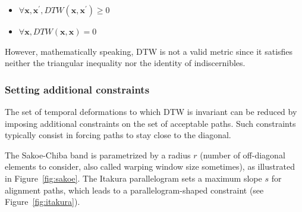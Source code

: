\begin{itemize}
\item $\forall \mathbf{x}, \mathbf{x}^\prime, DTW(\mathbf{x}, \mathbf{x}^\prime) \geq 0$
\item $\forall \mathbf{x}, DTW(\mathbf{x}, \mathbf{x}) = 0$
\end{itemize}

However, mathematically speaking, DTW is not a valid metric since it
satisfies neither the triangular inequality nor the identity of indiscernibles.

\subsubsection{Setting additional constraints}

The set of temporal deformations to which DTW is invariant can be reduced by
imposing additional constraints on the set of acceptable paths.
Such constraints typically consist in forcing paths to stay close to the
diagonal.

The Sakoe-Chiba band is parametrized by a radius $r$ (number of
off-diagonal elements to consider, also called warping window size sometimes),
as illustrated in Figure~\ref{fig:sakoe}.
The Itakura parallelogram sets a maximum slope $s$ for alignment
paths, which leads to a parallelogram-shaped constraint (see Figure~\ref{fig:itakura}).

